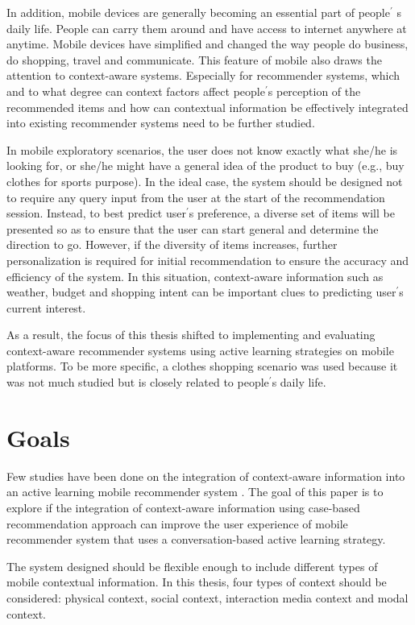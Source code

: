 In addition, mobile devices are generally becoming an essential part of people$^\prime$ s daily life. People can carry them around and have access to internet anywhere at anytime. Mobile devices have simplified and changed the way people do business, do shopping, travel and communicate. This feature of mobile also draws the attention to context-aware systems. Especially for recommender systems, which and to what degree can context factors affect people$^\prime$s perception of the recommended items and how can contextual information be effectively integrated into existing recommender systems need to be further studied. 

In mobile exploratory scenarios, the user does not know exactly what she/he is looking for, or she/he might have a general idea of the product to buy (e.g., buy clothes for sports purpose). In the ideal case, the system should be designed not to require any query input from the user at the start of the recommendation session. Instead, to best predict user$^\prime$s preference, a diverse set of items will be presented so as to ensure that the user can start general and determine the direction to go. However, if the diversity of items increases, further personalization is required for initial recommendation to ensure the accuracy and efficiency of the system. In this situation, context-aware information such as weather, budget and shopping intent can be important clues to predicting user$^\prime$s current interest. 

As a result, the focus of this thesis shifted to implementing and evaluating context-aware recommender systems using active learning strategies on mobile platforms. To be more specific, a clothes shopping scenario was used because it was not much studied but is closely related to people$^\prime$s daily life.

\section{Goals} \label{sec:gl}

Few studies have been done on the integration of context-aware information into an active learning mobile recommender system \cite{ref:5, ref:12, ref:26}. The goal of this paper is to explore if the integration of context-aware information using case-based recommendation approach can improve the user experience of mobile recommender system that uses a conversation-based active learning strategy.

The system designed should be flexible enough to include different types of mobile contextual information. In this thesis, four types of context should be considered: physical context, social context, interaction media context and modal context.

